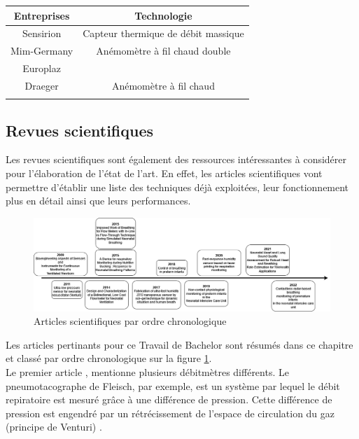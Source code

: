 \begin{centering}
    \begin{tabular}{|c|c|}
        \hline
        Entreprises & Technologie                         \\
        \hline
        Sensirion   & Capteur thermique de débit massique \\
        \hline
        Mim-Germany & Anémomètre à fil chaud double       \\
        \hline
        Europlaz    &                                     \\
        \hline
        Draeger     & Anémomètre à fil chaud              \\
        \hline
        \label{tab:marques}
    \end{tabular}
\end{centering}


\subsection{Revues scientifiques}
Les revues scientifiques sont également des ressources intéressantes à considérer pour l'élaboration de l'état de l'art. En effet, les 
articles scientifiques vont permettre d'établir une liste des techniques déjà exploitées, leur fonctionnement plus en détail ainsi que leurs 
performances. \\
\begin{figure}[H]
    \centering
    \includegraphics[scale = 0.3]{images/DRP_Etat_de_l_art.png}
    \caption{Articles scientifiques par ordre chronologique}
    \label{fig:articlesChrono}
\end{figure}

Les articles pertinants pour ce Travail de Bachelor sont résumés dans ce chapitre et classé par ordre chronologique sur la figure 
\ref{fig:articlesChrono}. \\

Le premier article \cite{rolfe_bioengineering_2009}, mentionne plusieurs débitmètres différents. Le pneumotacographe de Fleisch, par exemple, est un 
système par lequel le débit repiratoire est mesuré grâce à une différence de pression. Cette différence de pression est engendré par 
un rétrécissement de l'espace de circulation du gaz (principe de Venturi) \cite{oberg_biomedical_2011}. \\

